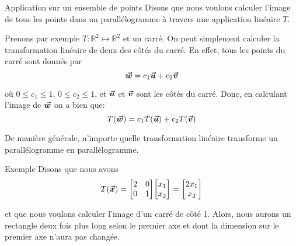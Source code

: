 \documentclass{article}
\begin{document}
\begin{parag}{Application sur un ensemble de points}
    Disons que nous voulons calculer l'image de tous les points dans un parallélogramme à travers une application linéaire $T$.

    Prenons par exemple $T: \mathbb{R}^2 \mapsto \mathbb{R}^2$ et un carré. On peut simplement calculer la transformation linéaire de deux des côtés du carré. En effet, tous les points du carré sont donnés par
    \[\bm{\protect\vec{w}} = c_1 \bm{\protect\vec{u}} + c_2 \bm{\protect\vec{v}}\]

    où $0 \leq c_1 \leq 1$, $0 \leq c_2 \leq 1$, et $\bm{\protect\vec{u}}$ et $\bm{\protect\vec{v}}$ sont les côtés du carré. Donc, en calculant l'image de $\bm{\protect\vec{w}}$ on a bien que:
    \[T\left(\bvec{w}\right) = c_1 T\left(\bvec{u}\right) + c_2 T\left(\bvec{v}\right)\]


    De manière générale, n'importe quelle transformation linéaire transforme un parallélogramme en parallélogramme.
\end{parag}

\begin{parag}{Exemple}
    Disons que nous avons
    \[T\left(\bvec{x}\right) = \begin{bmatrix} 2 & 0 \\ 0 & 1 \end{bmatrix} \begin{bmatrix} x_1 \\ x_2 \end{bmatrix} = \begin{bmatrix} 2x_1 \\ x_2 \end{bmatrix} \]

    et que nous voulons calculer l'image d'un carré de côté 1. Alors, nous aurons un rectangle deux fois plus long selon le premier axe et dont la dimension sur le premier axe n'aura pas changée.

\end{parag}
\end{document}
